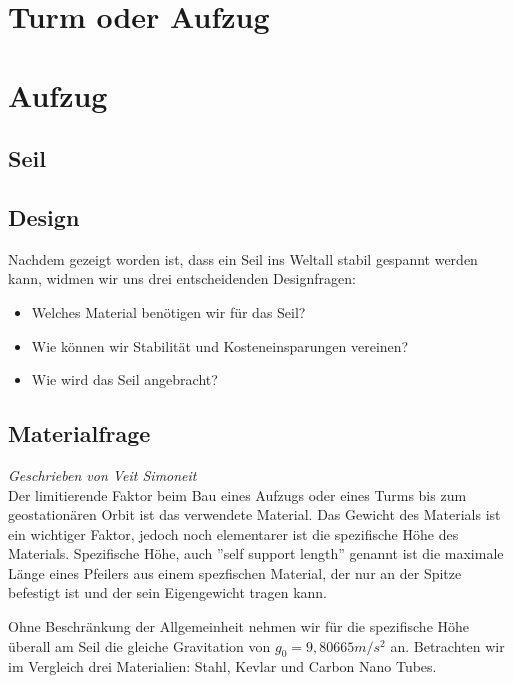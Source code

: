 \documentclass[a4paper, 10pt]{report}
\begin{document}
\chapter{Turm oder Aufzug}



\chapter{Aufzug}

\section{Seil}



\section{Design}

Nachdem gezeigt worden ist, dass ein Seil ins Weltall stabil gespannt werden kann, widmen wir uns drei entscheidenden Designfragen: 
\begin{itemize}
\item Welches Material benötigen wir für das Seil?
\item Wie können wir Stabilität und Kosteneinsparungen vereinen?
\item Wie wird das Seil angebracht?
\end{itemize}

\section{Materialfrage}
\textsl{Geschrieben von Veit Simoneit}\\
Der limitierende Faktor beim Bau eines Aufzugs oder eines Turms bis zum geostationären Orbit ist das verwendete Material. Das Gewicht des Materials ist ein wichtiger Faktor, jedoch noch elementarer ist die spezifische Höhe des Materials. Spezifische Höhe, auch ''self support length'' genannt ist die maximale Länge eines Pfeilers aus einem spezfischen Material, der nur an der Spitze befestigt ist und der sein Eigengewicht tragen kann.\cite{wiki:Specific_strength}

Ohne Beschränkung der Allgemeinheit nehmen wir für die spezifische Höhe überall am Seil die gleiche Gravitation von $g_0 = 9,80665 m/s^2$ an.
Betrachten wir im Vergleich drei Materialien: Stahl, Kevlar und Carbon Nano Tubes. \cite[vergleiche]{ED00}
\end{document}
